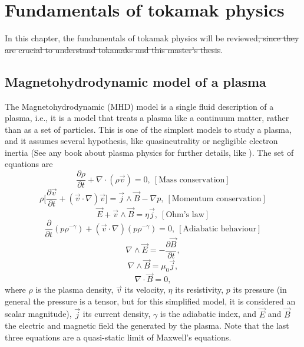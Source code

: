 \documentclass[a4paper,12pt,oneside]{book}
\newcommand{\p}{\partial}
\begin{document}
\chapter{Fundamentals of tokamak physics}

In this chapter, the fundamentals of tokamak physics will be reviewed\st{, since they are crucial to understand tokamaks and this master's thesis}.


\section{Magnetohydrodynamic model of a plasma}
The Magnetohydrodynamic (MHD) model is a single fluid description of a plasma, i.e., it is a model that treats a plasma like a continuum matter, rather than as a set of particles. This is one of the simplest models to study a plasma, and it assumes several hypothesis, like quasineutrality or negligible electron inertia (See any book about plasma physics for further details, like \cite{Chen}). The set of equations are
%
\begin{equation}
\dfrac{\p \rho}{\p t}+\nabla \cdot (\rho \vec{v})=0, \ [\text{Mass conservation}] 
\end{equation}
\begin{equation} \label{momentum cons}
\rho \Big[\dfrac{\p \vec{v}}{\p t}+(\vec{v} \cdot \nabla)\vec{v} \Big]=\vec{j} \wedge \vec{B} -\nabla p, \ [\text{Momentum  conservation}] 
\end{equation}
\begin{equation}
\vec{E} +\vec{v} \wedge \vec{B}=\eta \vec{j}, \  [\text{Ohm's  law}] 
 \end{equation}
 \begin{equation}
\dfrac{\p}{\p t}(p \rho^{-\gamma})+(\vec{v} \cdot \nabla) (p \rho^{-\gamma})=0, \ [\text{Adiabatic  behaviour}] 
\end{equation}
\begin{equation} \label{faraday}
\nabla \wedge \vec{E}=- \dfrac{\p \vec{B}}{\p t},  
\end{equation}
\begin{equation}\label{ampere}
\nabla \wedge \vec{B}=\mu_0 \vec{j}, 
\end{equation}
\begin{equation} \label{nablaBnulo}
\nabla \cdot \vec{B}=0, 
\end{equation}
%
where $\rho$ is the plasma density, $\vec{v}$ its velocity, $\eta$ its resistivity, $p$ its pressure (in general the pressure is a tensor, but for this simplified model, it is considered an scalar magnitude), $\vec{j}$ its current density, $\gamma$ is the adiabatic index, and $\vec{E}$ and $\vec{B}$ the electric and magnetic field the generated by the plasma. Note that the last three equations are a quasi-static limit of Maxwell's equations.
\end{document}
